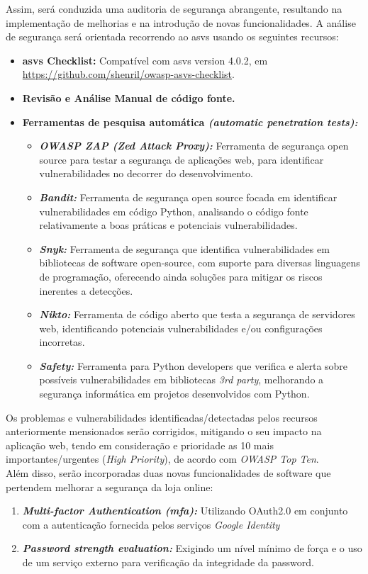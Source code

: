 Assim, será conduzida uma auditoria de segurança abrangente, resultando na implementação de melhorias e na introdução de novas funcionalidades. A análise de segurança será orientada recorrendo ao \ac{asvs} usando os seguintes recursos: 

\begin{itemize}
    \item \textbf{\ac{asvs} Checklist:} Compatível com \ac{asvs} version 4.0.2, em \url{https://github.com/shenril/owasp-asvs-checklist}.
    \item \textbf{Revisão e Análise Manual de código fonte.}
    \item \textbf{Ferramentas de pesquisa automática \textit{(automatic penetration tests):}}
        \begin{itemize}
            \item \textbf{\textit{OWASP ZAP (Zed Attack Proxy):}} Ferramenta de segurança open source para testar a segurança de aplicações web, para identificar vulnerabilidades no decorrer do desenvolvimento.  
            \item \textbf{\textit{Bandit:}} Ferramenta de segurança open source focada em identificar vulnerabilidades em código Python, analisando o código fonte relativamente a boas práticas e potenciais vulnerabilidades.
            \item \textbf{\textit{Snyk:}} Ferramenta de segurança que identifica vulnerabilidades em bibliotecas de software open-source, com suporte para diversas linguagens de programação, oferecendo ainda soluções para mitigar os riscos inerentes a detecções.
            \item \textbf{\textit{Nikto:}} Ferramenta de código aberto que testa a segurança de servidores web, identificando potenciais vulnerabilidades e/ou configurações incorretas.
            \item \textbf{\textit{Safety:}} Ferramenta para Python developers que verifica e alerta sobre possíveis vulnerabilidades em bibliotecas \textit{3rd party}, melhorando a segurança informática em projetos desenvolvidos com Python.
        \end{itemize}
\end{itemize}

Os problemas e vulnerabilidades identificadas/detectadas pelos recursos anteriormente mensionados serão corrigidos, mitigando o seu impacto na aplicação web, tendo em consideração e prioridade as 10 mais importantes/urgentes (\textit{High Priority}), de acordo com \textit{OWASP Top Ten}. \\
Além disso, serão incorporadas duas novas funcionalidades de software que pertendem melhorar a segurança da loja online: 
\begin{enumerate}
    \item \textbf{\textit{Multi-factor Authentication (\ac{mfa}):}} Utilizando OAuth2.0 em conjunto com a autenticação fornecida pelos serviços \textit{Google Identity}
    \item \textbf{\textit{Password strength evaluation:}} Exigindo um nível mínimo de força e o uso de um serviço externo para verificação da integridade da password.
\end{enumerate}

